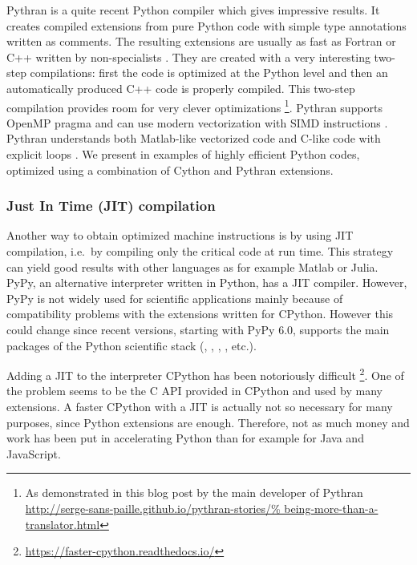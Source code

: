 Pythran \citep{guelton2015pythran, guelton2018pythran} is a quite recent Python
compiler which gives impressive results. It creates compiled extensions from pure
Python code with simple type annotations written as comments.
%
The resulting extensions are usually as fast as Fortran or C++ written by
non-specialists \citep[see, for example, benchmarks for the packages
 and ,][]{fluidfft, fluidsim}.
%
They are created with a very interesting two-step compilations: first the code
is optimized at the Python level and then an automatically produced C++ code is
properly compiled.
%
This two-step compilation provides room for very clever optimizations
\footnote{As demonstrated in this blog post by the main developer of
Pythran \url{http://serge-sans-paille.github.io/pythran-stories/%
being-more-than-a-translator.html}}.
%
Pythran supports OpenMP pragma \citep{guelton2013compiling} and can use modern
vectorization with SIMD instructions \citep{guelton2014exploring}. Pythran
understands both Matlab-like vectorized code and C-like code with explicit loops
\citep{guelton2018pythran}.
%
We present in \citet{fluidfft, fluidsim} examples of
highly efficient Python codes, optimized using a combination of Cython and
Pythran extensions.

\subsubsection{Just In Time (JIT) compilation}
Another way to obtain optimized machine instructions is by using JIT
compilation, i.e.\ by compiling only the critical code at run time.
%
This strategy can yield good results with other languages as for example Matlab
or Julia.
%
PyPy, an alternative interpreter written in Python, has a JIT compiler. However,
PyPy is not widely used for scientific applications mainly because of
compatibility problems with the extensions written for CPython.
%
However this could change since recent versions, starting with PyPy 6.0,
supports the main packages of the Python scientific stack (\Numpy, \Scipy,
, , etc.).

Adding a JIT to the interpreter CPython has been notoriously difficult
\footnote{\url{https://faster-cpython.readthedocs.io/}}. One of the
problem seems to be the C API provided in CPython and used by many extensions.
%
A faster CPython with a JIT is actually not so necessary for many purposes,
since Python extensions are enough. Therefore, not as much money and work
has been put in accelerating Python than for example for Java and JavaScript.

